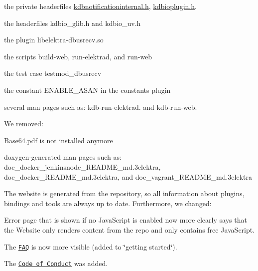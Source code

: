 \begin{DoxyItemize}
\item the private headerfiles {\ttfamily \hyperlink{kdbnotificationinternal_8h}{kdbnotificationinternal.\+h}}, {\ttfamily \hyperlink{kdbioplugin_8h}{kdbioplugin.\+h}}.
\item the headerfiles {\ttfamily kdbio\+\_\+glib.\+h} and {\ttfamily kdbio\+\_\+uv.\+h}
\item the plugin {\ttfamily libelektra-\/dbusrecv.\+so}
\item the scripts {\ttfamily build-\/web}, {\ttfamily run-\/elektrad}, and {\ttfamily run-\/web}
\item the test case {\ttfamily testmod\+\_\+dbusrecv}
\item the constant {\ttfamily E\+N\+A\+B\+L\+E\+\_\+\+A\+S\+AN} in the constants plugin
\item several man pages such as\+: {\ttfamily kdb-\/run-\/elektrad.} and {\ttfamily kdb-\/run-\/web.}
\end{DoxyItemize}

We removed\+:


\begin{DoxyItemize}
\item {\ttfamily Base64.\+pdf} is not installed anymore
\item doxygen-\/generated man pages such as\+: {\ttfamily doc\+\_\+docker\+\_\+jenkinsnode\+\_\+\+R\+E\+A\+D\+M\+E\+\_\+md.\+3elektra}, {\ttfamily doc\+\_\+docker\+\_\+\+R\+E\+A\+D\+M\+E\+\_\+md.\+3elektra}, and {\ttfamily doc\+\_\+vagrant\+\_\+\+R\+E\+A\+D\+M\+E\+\_\+md.\+3elektra}
\end{DoxyItemize}

The website is generated from the repository, so all information about plugins, bindings and tools are always up to date. Furthermore, we changed\+:


\begin{DoxyItemize}
\item Error page that is shown if no Java\+Script is enabled now more clearly says that the Website only renders content from the repo and only contains free Java\+Script.
\item The \href{https://www.libelektra.org/docgettingstarted/faq}{\tt F\+AQ} is now more visible (added to \char`\"{}getting started\char`\"{}).
\item The \href{https://www.libelektra.org/devgettingstarted/code-of-conduct}{\tt Code of Conduct} was added.
\end{DoxyItemize}


